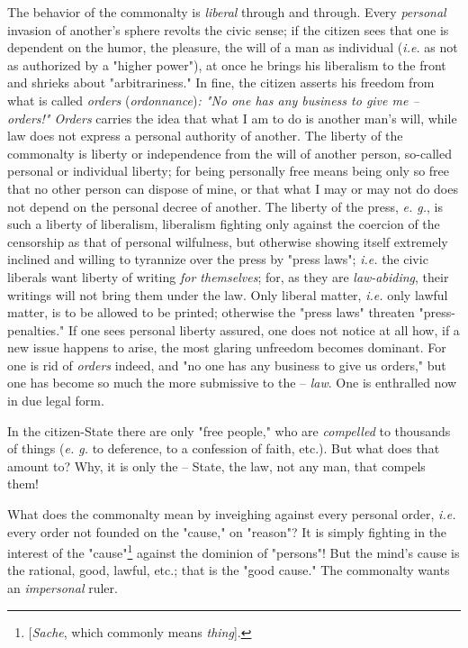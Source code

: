 The behavior of the commonalty is \textit{liberal} through and through. Every 
\textit{personal} invasion of another's sphere revolts the civic sense; if the 
citizen sees that one is dependent on the humor, the pleasure, the will of a 
man as individual (\textit{i.e.} as not as authorized by a "{}higher 
power"{}), at once he brings his liberalism to the front and shrieks about 
"{}arbitrariness."{} In fine, the citizen asserts his freedom from what is 
called \textit{orders} (\textit{ordonnance})\textit{: "{}No one has any 
business to give me -- orders!"{} Orders} carries the idea that what I am to 
do is another man's will, while law does not express a personal authority of 
another. The liberty of the commonalty is liberty or independence from the 
will of another person, so-called personal or individual liberty; for being 
personally free means being only so free that no other person can dispose of 
mine, or that what I may or may not do does not depend on the personal decree 
of another. The liberty of the press, \textit{e. g.}, is such a liberty of 
liberalism, liberalism fighting only against the coercion of the censorship as 
that of personal wilfulness, but otherwise showing itself extremely inclined 
and willing to tyrannize over the press by "{}press laws"{}; \textit{i.e.} the 
civic liberals want liberty of writing \textit{for themselves}; for, as they 
are \textit{law-abiding}, their writings will not bring them under the law. 
Only liberal matter, \textit{i.e.} only lawful matter, is to be allowed to be 
printed; otherwise the "{}press laws"{} threaten "{}press-penalties."{} If one 
sees personal liberty assured, one does not notice at all how, if a new issue 
happens to arise, the most glaring unfreedom becomes dominant. For one is rid 
of \textit{orders} indeed, and "{}no one has any business to give us 
orders,"{} but one has become so much the more submissive to the -- 
\textit{law}. One is enthralled now in due legal form.

In the citizen-State there are only "{}free people,"{} who are 
\textit{compelled} to thousands of things (\textit{e. g.} to deference, to a 
confession of faith, etc.). But what does that amount to? Why, it is only the 
-- State, the law, not any man, that compels them!

What does the commonalty mean by inveighing against every personal order, 
\textit{i.e.} every order not founded on the "{}cause,"{} on "{}reason"{}? It 
is simply fighting in the interest of the 
"{}cause"{}\footnote{[\textit{Sache}, which commonly means \textit{thing}].} 
against the dominion of "{}persons"{}! But the mind's cause is the rational, 
good, lawful, etc.; that is the "{}good cause."{} The commonalty wants an 
\textit{impersonal} ruler.

